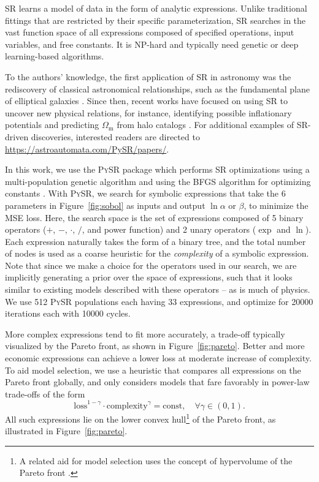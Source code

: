 \documentclass[12pt]{article}
\newcommand{\Omegam}{\Omega_\mathrm{m}}
\newcommand{\ap}{\alpha}
\newcommand{\tilt}{\beta}
\begin{document}
SR learns a model of data in the form of analytic expressions.
Unlike traditional fittings that are restricted by their specific
parameterization, SR searches in the vast function space of all
expressions composed of specified operations, input variables, and free
constants.
It is NP-hard \cite{SongEtAl2024, VirgolinPissis2022} and typically need
genetic or deep learning-based algorithms.

To the authors' knowledge, the first application of SR in astronomy was
the rediscovery of classical astronomical relationships, such as the
fundamental plane of elliptical galaxies \cite{Graham2013}.
Since then, recent works have focused on using SR to uncover new
physical relations, for instance, identifying possible inflationary
potentials \cite{Sousa2024} and predicting $\Omegam$ from halo catalogs
\cite{Shao2023}.
For additional examples of SR-driven discoveries, interested readers are
directed to \url{https://astroautomata.com/PySR/papers/}.

In this work, we use the \textsc{PySR} package \cite{Cranmer2020b,
Cranmer2023} which performs SR optimizations using a multi-population
genetic algorithm and using the BFGS algorithm for optimizing constants
\cite{NocedalWright2006}.
With \textsc{PySR}, we search for symbolic expressions that take the 6
parameters in Figure~\ref{fig:sobol} as inputs and output $\ln\ap$ or $\tilt$,
to minimize the MSE loss.
Here, the search space is the set of expressions composed of 5 binary
operators ($+$, $-$, $\cdot$, $/$, and power function) and 2 unary
operators ($\exp$ and $\ln$).
Each expression naturally takes the form of a binary tree, and the total
number of nodes is used as a coarse heuristic for the \emph{complexity}
of a symbolic expression.
Note that since we make a choice for the operators used in our search,
we are implicitly generating a prior over the space of expressions, such
that it looks similar to existing models described with these operators
-- as is much of physics.
We use 512 \textsc{PySR} populations each having 33 expressions, and
optimize for 20000 iterations each with 10000 cycles.

More complex expressions tend to fit more accurately, a trade-off
typically visualized by the Pareto front, as shown in Figure~\ref{fig:pareto}.
Better and more economic expressions can achieve a lower loss at
moderate increase of complexity.
To aid model selection, we use a heuristic that compares all expressions
on the Pareto front globally, and only considers models that fare
favorably in power-law trade-offs of the form
%
\begin{equation}
\mathrm{loss}^{1 - \gamma} \cdot \mathrm{complexity}^\gamma
= \mathrm{const}, \quad \forall \gamma \in (0, 1).
\end{equation}
All such expressions lie on the lower convex hull\footnote{A related aid
for model selection uses the concept of hypervolume of the Pareto front
\cite{Cao2015}.} of the Pareto front, as illustrated in
Figure~\ref{fig:pareto}.
\end{document}
